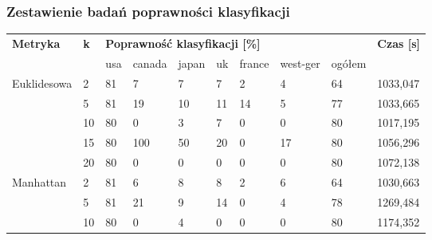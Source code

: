 \documentclass{classrep}
\begin{document}
\FloatBarrier
\subsubsection{Zestawienie badań poprawności klasyfikacji}

\begin{table}[!ht]
    \centering
    \begin{tabular}{|l||l|l|l|l|l|l|l|l|l|}
    \hline
    \multirow{2}{*}{\textbf{Metryka}} & \multirow{2}{*}{\textbf{k}} & \multicolumn{7}{l|}{\textbf{Poprawność klasyfikacji [\%]}}      & \multirow{2}{*}{\textbf{Czas [s]}} \\ \cline{3-9}
                                      &                    & usa & canada & japan & uk & france & west-ger & ogółem &                                              \\ \hline
    \multirow{5}{*}{Euklidesowa}      & 2                  & 81  & 7      & 7     & 7  & 2      & 4            & 64     & 1033,047                                     \\ \cline{2-10} 
                                      & 5                  & 81  & 19     & 10    & 11 & 14     & 5            & 77     & 1033,665                                     \\ \cline{2-10} 
                                      & 10                 & 80  & 0      & 3     & 7  & 0      & 0            & 80     & 1017,195                                     \\ \cline{2-10} 
                                      & 15                 & 80  & 100    & 50    & 20 & 0      & 17           & 80     & 1056,296                                     \\ \cline{2-10} 
                                      & 20                 & 80  & 0      & 0     & 0  & 0      & 0            & 80     & 1072,138                                     \\ \hline
    \multirow{5}{*}{Manhattan}        & 2                  & 81  & 6      & 8     & 8  & 2      & 6            & 64     & 1030,663                                     \\ \cline{2-10} 
                                      & 5                  & 81  & 21     & 9     & 14 & 0      & 4            & 78     & 1269,484                                     \\ \cline{2-10} 
                                      & 10                 & 80  & 0      & 4     & 0  & 0      & 0            & 80     & 1174,352                                     \\ \cline{2-10} 

\end{tabular}
\end{table}
\end{document}
